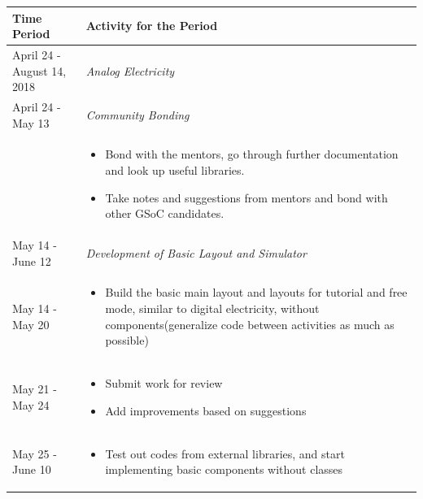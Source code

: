 \documentclass[preprint,12pt]{elsarticle}
\begin{document}
\begin{center}
\setlength{\extrarowheight}{1.75pt}
\begin{tabularx}{\linewidth}{|l|X|}
\hline

\textbf{Time Period} & \textbf{Activity for the Period}\\
\hline

{April 24 - August 14, 2018} & {\textit{Analog Electricity}}\\
\hline

{April 24 - May 13} & {\textit{Community Bonding}}\\
\hline

 & \par
\parbox{12cm}{
\begin{itemize}[noitemsep, topsep=2pt]
	\item Bond with the mentors, go through further documentation and look up useful libraries.
	\item Take notes and suggestions from mentors and bond with other GSoC candidates.
\end{itemize}
}\\
\hline\hline

{May 14 - June 12} & {\textit{Development of Basic Layout and Simulator}}\\
\hline

{May 14 - May 20} & \par
\parbox{12cm}{
\begin{itemize}[noitemsep, topsep=2pt]
	\item Build the basic main layout and layouts for tutorial and free mode, similar to digital electricity, without components(generalize code between activities as much as possible)
\end{itemize}
}\\
\hline

{May 21 - May 24} & \par
\parbox{12cm}{
\begin{itemize}[noitemsep, topsep=2pt]
	\item Submit work for review
	\item Add improvements based on suggestions
\end{itemize}
}\\
\hline

{May 25 - June 10} & \par
\parbox{12cm}{
\begin{itemize}[noitemsep, topsep=2pt]
	\item Test out codes from external libraries, and start implementing basic components without classes


\end{itemize}}
\end{tabularx}
\end{center}
\end{document}
